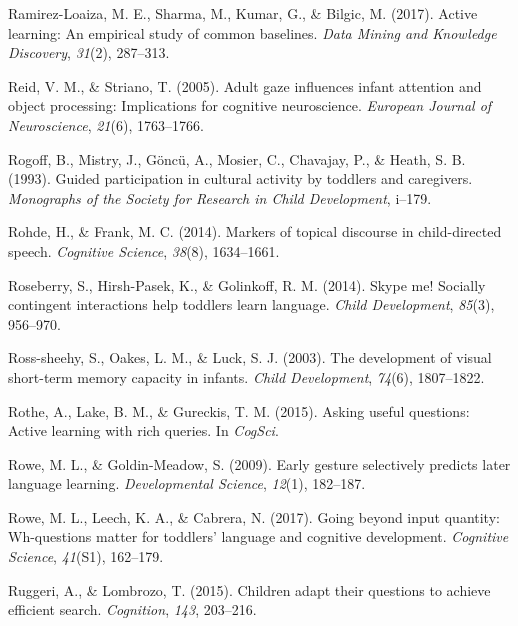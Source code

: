 \documentclass[oneside]{report}
\begin{document}
\leavevmode\hypertarget{ref-ramirez2017active}{}%
Ramirez-Loaiza, M. E., Sharma, M., Kumar, G., \& Bilgic, M. (2017).
Active learning: An empirical study of common baselines. \emph{Data
Mining and Knowledge Discovery}, \emph{31}(2), 287--313.

\leavevmode\hypertarget{ref-reid2005adult}{}%
Reid, V. M., \& Striano, T. (2005). Adult gaze influences infant
attention and object processing: Implications for cognitive
neuroscience. \emph{European Journal of Neuroscience}, \emph{21}(6),
1763--1766.

\leavevmode\hypertarget{ref-rogoff1993guided}{}%
Rogoff, B., Mistry, J., Göncü, A., Mosier, C., Chavajay, P., \& Heath,
S. B. (1993). Guided participation in cultural activity by toddlers and
caregivers. \emph{Monographs of the Society for Research in Child
Development}, i--179.

\leavevmode\hypertarget{ref-rohde2014markers}{}%
Rohde, H., \& Frank, M. C. (2014). Markers of topical discourse in
child-directed speech. \emph{Cognitive Science}, \emph{38}(8),
1634--1661.

\leavevmode\hypertarget{ref-roseberry2014skype}{}%
Roseberry, S., Hirsh-Pasek, K., \& Golinkoff, R. M. (2014). Skype me!
Socially contingent interactions help toddlers learn language.
\emph{Child Development}, \emph{85}(3), 956--970.

\leavevmode\hypertarget{ref-ross2003development}{}%
Ross-sheehy, S., Oakes, L. M., \& Luck, S. J. (2003). The development of
visual short-term memory capacity in infants. \emph{Child Development},
\emph{74}(6), 1807--1822.

\leavevmode\hypertarget{ref-rothe2015asking}{}%
Rothe, A., Lake, B. M., \& Gureckis, T. M. (2015). Asking useful
questions: Active learning with rich queries. In \emph{CogSci}.

\leavevmode\hypertarget{ref-rowe2009early}{}%
Rowe, M. L., \& Goldin-Meadow, S. (2009). Early gesture selectively
predicts later language learning. \emph{Developmental Science},
\emph{12}(1), 182--187.

\leavevmode\hypertarget{ref-rowe2017going}{}%
Rowe, M. L., Leech, K. A., \& Cabrera, N. (2017). Going beyond input
quantity: Wh-questions matter for toddlers' language and cognitive
development. \emph{Cognitive Science}, \emph{41}(S1), 162--179.

\leavevmode\hypertarget{ref-ruggeri2015children}{}%
Ruggeri, A., \& Lombrozo, T. (2015). Children adapt their questions to
achieve efficient search. \emph{Cognition}, \emph{143}, 203--216.
\end{document}
